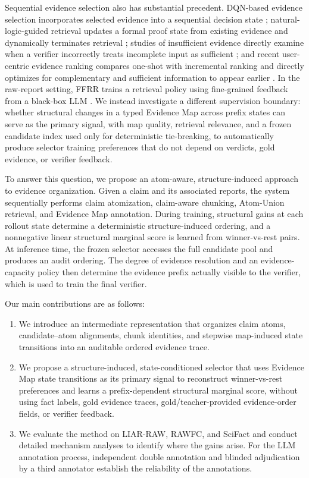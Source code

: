 \documentclass[letterpaper]{article}
\begin{document}
Sequential evidence selection also has substantial precedent. DQN-based evidence selection incorporates selected evidence into a sequential decision state \citep{Wan2021DQN}; natural-logic-guided retrieval updates a formal proof state from existing evidence and dynamically terminates retrieval \citep{Aly2022NaturalLogic}; studies of insufficient evidence directly examine when a verifier incorrectly treats incomplete input as sufficient \citep{Atanasova2022Insufficient}; and recent user-centric evidence ranking compares one-shot with incremental ranking and directly optimizes for complementary and sufficient information to appear earlier \citep{Alt2026EvidenceRanking}. In the raw-report setting, FFRR trains a retrieval policy using fine-grained feedback from a black-box LLM \citep{Zhang2024FFRR}. We instead investigate a different supervision boundary: whether structural changes in a typed Evidence Map across prefix states can serve as the primary signal, with map quality, retrieval relevance, and a frozen candidate index used only for deterministic tie-breaking, to automatically produce selector training preferences that do not depend on verdicts, gold evidence, or verifier feedback.

To answer this question, we propose an atom-aware, structure-induced approach to evidence organization. Given a claim and its associated reports, the system sequentially performs claim atomization, claim-aware chunking, Atom-Union retrieval, and Evidence Map annotation. During training, structural gains at each rollout state determine a deterministic structure-induced ordering, and a nonnegative linear structural marginal score is learned from winner-vs-rest pairs. At inference time, the frozen selector accesses the full candidate pool and produces an audit ordering. The degree of evidence resolution and an evidence-capacity policy then determine the evidence prefix actually visible to the verifier, which is used to train the final verifier.

Our main contributions are as follows:

\begin{enumerate}
\item We introduce an intermediate representation that organizes claim atoms, candidate--atom alignments, chunk identities, and stepwise map-induced state transitions into an auditable ordered evidence trace.
\item We propose a structure-induced, state-conditioned selector that uses Evidence Map state transitions as its primary signal to reconstruct winner-vs-rest preferences and learns a prefix-dependent structural marginal score, without using fact labels, gold evidence traces, gold/teacher-provided evidence-order fields, or verifier feedback.
\item We evaluate the method on LIAR-RAW, RAWFC, and SciFact and conduct detailed mechanism analyses to identify where the gains arise. For the LLM annotation process, independent double annotation and blinded adjudication by a third annotator establish the reliability of the annotations.
\end{enumerate}
\end{document}
